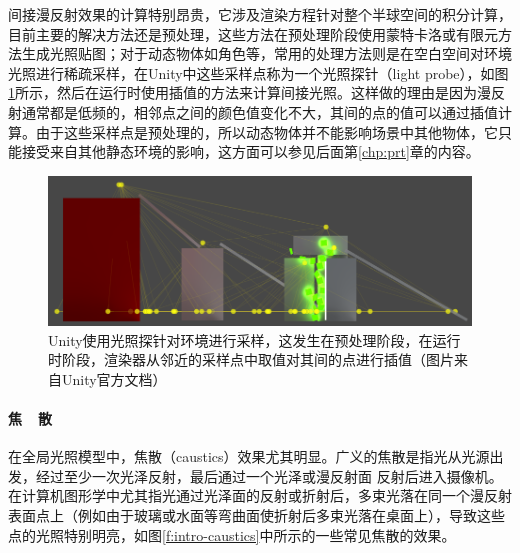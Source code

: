间接漫反射效果的计算特别昂贵，它涉及渲染方程针对整个半球空间的积分计算，目前主要的解决方法还是预处理，这些方法在预处理阶段使用蒙特卡洛或有限元方法生成光照贴图；对于动态物体如角色等，常用的处理方法则是在空白空间对环境光照进行稀疏采样，在Unity中这些采样点称为一个光照探针（light probe），如图\ref{f:intro-light-probe}所示，然后在运行时使用插值的方法来计算间接光照。这样做的理由是因为漫反射通常都是低频的，相邻点之间的颜色值变化不大，其间的点的值可以通过插值计算。由于这些采样点是预处理的，所以动态物体并不能影响场景中其他物体，它只能接受来自其他静态环境的影响，这方面可以参见后面第\ref{chp:prt}章的内容。

\begin{figure}
\includegraphics[width=\textwidth]{figures/intro/LightProbes}	
\caption{Unity使用光照探针对环境进行采样，这发生在预处理阶段，在运行时阶段，渲染器从邻近的采样点中取值对其间的点进行插值（图片来自Unity官方文档）}
\label{f:intro-light-probe}
\end{figure}




\paragraph{焦~~散}
在全局光照模型中，焦散（caustics）效果尤其明显。广义的焦散是指光从光源出发，经过至少一次光泽反射，最后通过一个光泽或漫反射面 反射后进入摄像机。在计算机图形学中尤其指光通过光泽面的反射或折射后，多束光落在同一个漫反射表面点上（例如由于玻璃或水面等弯曲面使折射后多束光落在桌面上），导致这些点的光照特别明亮，如图\ref{f:intro-caustics}中所示的一些常见焦散的效果。


